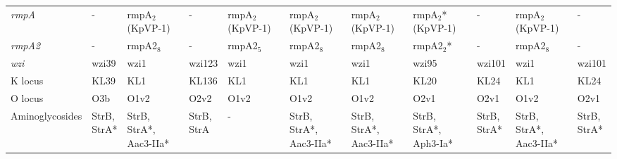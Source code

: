 \begin{sidewaystable}[ht]
\begin{threeparttable}
\begin{tabularx}{\textwidth}{lllllllllll}
                 \textit{rmpA} &                      - &         \mCL{rmpA$_2$\\(KpVP-1)} &                 - & \mCL{rmpA$_2$\\(KpVP-1)} &        \mCL{rmpA$_2$\\(KpVP-1)} &       \mCL{rmpA$_2$\\(KpVP-1)} &        \mCL{rmpA$_2$*\\(KpVP-1)} &                       - &         \mCL{rmpA$_2$\\(KpVP-1)} &                       - \\
                \textit{rmpA2} &                      - &                        rmpA2$_8$ &                 - &                rmpA2$_5$ &                       rmpA2$_8$ &                      rmpA2$_8$ &                       rmpA2$_2$* &                       - &                        rmpA2$_8$ &                       - \\
                  \textit{wzi} &                  wzi39 &                             wzi1 &            wzi123 &                     wzi1 &                            wzi1 &                           wzi1 &                            wzi95 &                  wzi101 &                             wzi1 &                  wzi101 \\
                       K locus &                   KL39 &                              KL1 &             KL136 &                      KL1 &                             KL1 &                            KL1 &                             KL20 &                    KL24 &                              KL1 &                    KL24 \\
                       O locus &                    O3b &                             O1v2 &              O2v2 &                     O1v2 &                            O1v2 &                           O1v2 &                             O2v1 &                    O2v1 &                             O1v2 &                    O2v1 \\
               Aminoglycosides &     \mCL{StrB,\\StrA*} &   \mCL{StrB,\\StrA*,\\Aac3-IIa*} & \mCL{StrB,\\StrA} &                        - &  \mCL{StrB,\\StrA*,\\Aac3-IIa*} & \mCL{StrB,\\StrA*,\\Aac3-IIa*} &    \mCL{StrB,\\StrA*,\\Aph3-Ia*} &      \mCL{StrB,\\StrA*} &   \mCL{StrB,\\StrA*,\\Aac3-IIa*} &      \mCL{StrB,\\StrA*} \\

\end{tabularx}
\end{threeparttable}
\end{sidewaystable}
